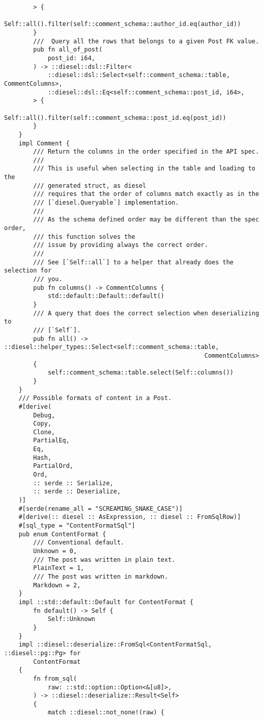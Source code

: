 \begin{verbatim}
        > {
            Self::all().filter(self::comment_schema::author_id.eq(author_id))
        }
        ///  Query all the rows that belongs to a given Post FK value.
        pub fn all_of_post(
            post_id: i64,
        ) -> ::diesel::dsl::Filter<
            ::diesel::dsl::Select<self::comment_schema::table, CommentColumns>,
            ::diesel::dsl::Eq<self::comment_schema::post_id, i64>,
        > {
            Self::all().filter(self::comment_schema::post_id.eq(post_id))
        }
    }
    impl Comment {
        /// Return the columns in the order specified in the API spec.
        ///
        /// This is useful when selecting in the table and loading to the
        /// generated struct, as diesel
        /// requires that the order of columns match exactly as in the
        /// [`diesel.Queryable`] implementation.
        ///
        /// As the schema defined order may be different than the spec order,
        /// this function solves the
        /// issue by providing always the correct order.
        ///
        /// See [`Self::all`] to a helper that already does the selection for
        /// you.
        pub fn columns() -> CommentColumns {
            std::default::Default::default()
        }
        /// A query that does the correct selection when deserializing to
        /// [`Self`].
        pub fn all() -> ::diesel::helper_types::Select<self::comment_schema::table,
                                                       CommentColumns>
        {
            self::comment_schema::table.select(Self::columns())
        }
    }
    /// Possible formats of content in a Post.
    #[derive(
        Debug,
        Copy,
        Clone,
        PartialEq,
        Eq,
        Hash,
        PartialOrd,
        Ord,
        :: serde :: Serialize,
        :: serde :: Deserialize,
    )]
    #[serde(rename_all = "SCREAMING_SNAKE_CASE")]
    #[derive(:: diesel :: AsExpression, :: diesel :: FromSqlRow)]
    #[sql_type = "ContentFormatSql"]
    pub enum ContentFormat {
        /// Conventional default.
        Unknown = 0,
        /// The post was written in plain text.
        PlainText = 1,
        /// The post was written in markdown.
        Markdown = 2,
    }
    impl ::std::default::Default for ContentFormat {
        fn default() -> Self {
            Self::Unknown
        }
    }
    impl ::diesel::deserialize::FromSql<ContentFormatSql, ::diesel::pg::Pg> for
        ContentFormat
    {
        fn from_sql(
            raw: ::std::option::Option<&[u8]>,
        ) -> ::diesel::deserialize::Result<Self>
        {
            match ::diesel::not_none!(raw) {

\end{verbatim}
